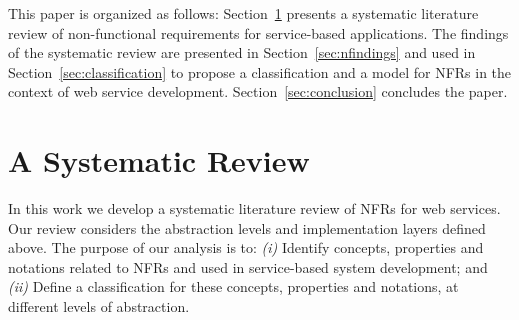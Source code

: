 \documentclass{sig-alternate}
\begin{document}
\bigskip

This paper is organized as follows: 
Section~\ref{sec:sr} presents a systematic literature review of non-functional requirements for service-based applications.
The findings of the systematic review are presented in Section~\ref{sec:nfindings} and used in Section~\ref{sec:classification} to propose a classification and a model for NFRs in the context of web service development. 
Section~\ref{sec:conclusion} concludes the paper.


\section{A Systematic Review}  
\label{sec:sr}

In this work we develop a systematic literature review of NFRs for web services. 
Our review considers the abstraction levels and implementation layers defined above. 
%
The purpose of our analysis is to: 
\textit{(i)} Identify concepts, properties and notations related to NFRs and used in service-based system development; and 
\textit{(ii)} Define a classification for these concepts, properties and notations, at different  levels of abstraction.



\end{document}
